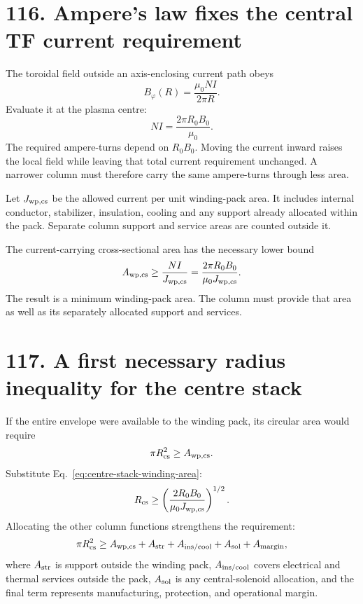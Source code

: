 \documentclass[11pt]{article}
\begin{document}
\section*{116. Ampere's law fixes the central TF current requirement}
The toroidal field outside an axis-enclosing current path obeys
\[
 B_\varphi(R)=\frac{\mu_0NI}{2\pi R}.
\]
Evaluate it at the plasma centre:
\begin{equation}
 NI=\frac{2\pi R_0B_0}{\mu_0}.
 \label{eq:centre-stack-ampere-turns}
\end{equation}
The required ampere-turns depend on $R_0B_0$. Moving the current inward raises
the local field while leaving that total current requirement unchanged.
A narrower column must therefore carry the same ampere-turns through less area.

Let $J_{\rm wp,cs}$ be the allowed current per unit winding-pack area. It includes
internal conductor, stabilizer, insulation, cooling and any support already
allocated within the pack. Separate column support and service areas are counted outside it.

The current-carrying cross-sectional area has the necessary lower bound
\begin{equation}
 A_{\rm wp,cs}\ge
\frac{NI}{J_{\rm wp,cs}}
=\frac{2\pi R_0B_0}{\mu_0J_{\rm wp,cs}}.
 \label{eq:centre-stack-winding-area}
\end{equation}
The result is a minimum winding-pack area. The column must provide that area as
well as its separately allocated support and services.

\section*{117. A first necessary radius inequality for the centre stack}
If the entire envelope were available to the winding pack, its circular area would require
\[
 \pi R_{\rm cs}^2\ge A_{\rm wp,cs}.
\]
Substitute Eq.~\eqref{eq:centre-stack-winding-area}:
\begin{equation}
 R_{\rm cs}\ge
\left(\frac{2R_0B_0}{\mu_0J_{\rm wp,cs}}\right)^{1/2}.
 \label{eq:centre-stack-radius-current-bound}
\end{equation}
Allocating the other column functions strengthens the requirement:
\begin{equation}
 \pi R_{\rm cs}^2\ge
 A_{\rm wp,cs}+A_{\rm str}+A_{\rm ins/cool}+A_{\rm sol}
+A_{\rm margin},
 \label{eq:centre-stack-area-ledger}
\end{equation}
where $A_{\rm str}$ is support outside the winding pack, $A_{\rm ins/cool}$
covers electrical and thermal services outside the pack, $A_{\rm sol}$ is any
central-solenoid allocation, and the final term represents manufacturing,
protection, and operational margin.
\end{document}
